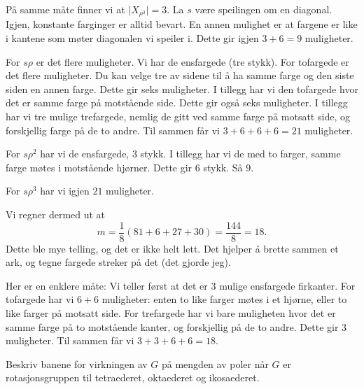 \documentclass[11pt, norsk]{article}
\begin{document}
\begin{losn}
\begin{enumerate}[a)]
På samme måte finner vi at $\lvert X_{\rho^3} \rvert = 3$. La $s$ være speilingen om en diagonal. Igjen, konstante farginger er alltid bevart. En annen mulighet er at fargene er like i kantene som møter diagonalen vi speiler i. Dette gir igjen $3+6=9$ muligheter.

For $s\rho$ er det flere muligheter. Vi har de ensfargede (tre stykk). For tofargede er det flere muligheter. Du kan velge tre av sidene til å ha samme farge og den siste siden en annen farge. Dette gir seks muligheter. I tillegg har vi den tofargede hvor det er samme farge på motstående side. Dette gir også seks muligheter. I tillegg har vi tre mulige trefargede, nemlig de gitt ved samme farge på motsatt side, og forskjellig farge på de to andre. Til sammen får vi $3+6+6+6=21$ muligheter.

For $s\rho^2$ har vi de ensfargede, $3$ stykk. I tillegg har vi de med to farger, samme farge møtes i motstående hjørner. Dette gir $6$ stykk. Så $9$.

For $s \rho^3$ har vi igjen $21$ muligheter.

Vi regner dermed ut at 
\[
m = \frac{1}{8} \left( 81+6 + 27+30\right) = \frac{144}{8} = 18.
\]
Dette ble mye telling, og det er ikke helt lett. Det hjelper å brette sammen et ark, og tegne fargede streker på det (det gjorde jeg).

Her er en enklere måte: Vi teller først at det er $3$ mulige ensfargede firkanter. For tofargede har vi $6+6$ muligheter: enten to like farger møtes i et hjørne, eller to like farger på motsatt side. For trefargede har vi bare muligheten hvor det er samme farge på to motstående kanter, og forskjellig på de to andre. Dette gir $3$ muligheter. Til sammen får vi $3+3+6+6=18$. 
  \end{enumerate}
\end{losn}

\begin{oppg}
Beskriv banene for virkningen av $G$ på mengden av poler når $G$ er rotasjonsgruppen til tetraederet, oktaederet og ikosaederet.
\end{oppg}
\end{document}
